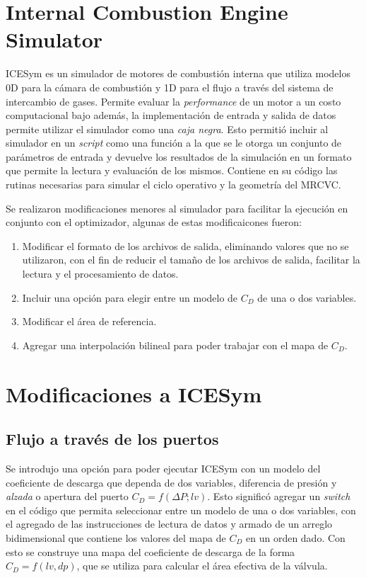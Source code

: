 \section{Internal Combustion Engine Simulator}
%
ICESym es un simulador de motores de combustión interna que  utiliza modelos 0D
para la cámara de combustión y 1D para el flujo a través del sistema de
intercambio de gases.
%
Permite evaluar la \emph{performance} de un motor a un costo computacional bajo
además, la implementación de entrada y salida de datos permite utilizar el
simulador como una \emph{caja negra}.
%
Esto permitió incluir al simulador en un \emph{script} como una función a la que
se le otorga un conjunto de parámetros de entrada y devuelve los resultados de
la simulación en un formato que permite la lectura y evaluación de los mismos.
%
Contiene en su código las rutinas necesarias para simular el ciclo operativo y la
geometría del MRCVC.

Se realizaron modificaciones menores al simulador para facilitar la ejecución en
conjunto con el optimizador, algunas de estas modificaicones fueron:
%
\begin{enumerate}
    \item Modificar el formato de los archivos de salida, eliminando valores que
no se utilizaron, con el fin de reducir el tamaño de los archivos de salida,
facilitar la lectura y el procesamiento de datos.
    \item Incluir una opción para elegir entre un modelo de $C_D$ de una o dos
variables.
    \item Modificar el área de referencia.
    \item Agregar una interpolación bilineal para poder trabajar con el mapa de
$C_D$.
\end{enumerate}


\section{Modificaciones a ICESym}
\subsection{Flujo a través de los puertos}
%
Se introdujo una opción para poder ejecutar ICESym con un modelo del coeficiente
de descarga que dependa de dos variables, diferencia de presión y \emph{alzada}
o apertura del puerto $C_D = f(\Delta P; lv)$.
%
Esto significó agregar un \emph{switch} en el código que permita seleccionar
entre un modelo de una o dos variables, con el agregado de las instrucciones de
lectura de datos y armado de un arreglo bidimensional que contiene los valores
del mapa de $C_{D}$ en un orden dado.
%
Con esto se construye una mapa del coeficiente de descarga de la forma $C_D =
f(lv, dp)$, que se utiliza para calcular el área efectiva de la válvula.

